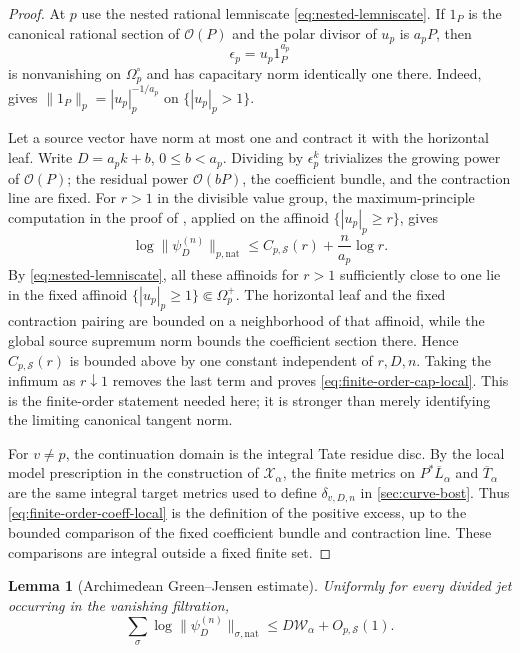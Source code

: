 \documentclass[11pt]{article}
\newtheorem{lemma}[lemma]{Lemma}
\theoremstyle{definition}
\theoremstyle{remark}
\begin{document}
\begin{proof}
At $p$ use the nested rational lemniscate
\eqref{eq:nested-lemniscate}.  If $1_P$ is the canonical rational section of
$\mathcal O(P)$ and the polar divisor of $u_p$ is $a_pP$, then
\begin{equation}\label{eq:unit-lemniscate-frame}
 \epsilon_p=u_p1_P^{a_p}
\end{equation}
is nonvanishing on $\Omega_p^\circ$ and has capacitary norm identically one
there.  Indeed, \cite[Corollary~5.8]{BostChambertLoir2009} gives
$\|1_P\|_p=|u_p|_p^{-1/a_p}$ on $\{|u_p|_p>1\}$.

Let a source vector have norm at most one and contract it with the horizontal
leaf.  Write $D=a_pk+b$, $0\le b<a_p$.  Dividing by $\epsilon_p^k$
trivializes the growing power of $\mathcal O(P)$; the residual power
$\mathcal O(bP)$, the coefficient bundle, and the contraction line are fixed.
For $r>1$ in the divisible value group, the maximum-principle computation in
the proof of \cite[Proposition~5.15]{BostChambertLoir2009}, applied on the
affinoid $\{|u_p|_p\ge r\}$, gives
\[
 \log\|\psi_D^{(n)}\|_{p,\mathrm{nat}}
 \le C_{p,\mathcal S}(r)+\frac{n}{a_p}\log r.
\]
By \eqref{eq:nested-lemniscate}, all these affinoids for $r>1$ sufficiently
close to one lie in the fixed affinoid
$\{|u_p|_p\ge1\}\Subset\Omega_p^+$.  The horizontal leaf and the fixed
contraction pairing are bounded on a neighborhood of that affinoid, while the
global source supremum norm bounds the coefficient section there.  Hence
$C_{p,\mathcal S}(r)$ is bounded above by one constant independent of
$r,D,n$.  Taking the infimum as $r\downarrow1$ removes the last term and
proves \eqref{eq:finite-order-cap-local}.  This is the finite-order statement
needed here; it is stronger than merely identifying the limiting canonical
tangent norm.

For $v\ne p$, the continuation domain is the integral Tate residue disc.  By
the local model prescription in the construction of $\mathscr X_\alpha$, the
finite metrics on $P^*\overline L_\alpha$ and $\overline T_\alpha$ are the
same integral target metrics used to define $\delta_{v,D,n}$ in
\cref{sec:curve-bost}.  Thus
\eqref{eq:finite-order-coeff-local} is the definition of the positive excess,
up to the bounded comparison of the fixed coefficient bundle and contraction
line.  These comparisons are integral outside a fixed finite set.
\end{proof}

\begin{lemma}[Archimedean Green--Jensen estimate]
\label{lem:arch-exact-jet}
Uniformly for every divided jet occurring in the vanishing filtration,
\begin{equation}\label{eq:arch-exact-jet}
 \sum_{\sigma}
 \log\|\psi_D^{(n)}\|_{\sigma,\mathrm{nat}}
 \le D\mathscr W_\alpha+O_{p,\mathcal S}(1).
\end{equation}
\end{lemma}
\end{document}
